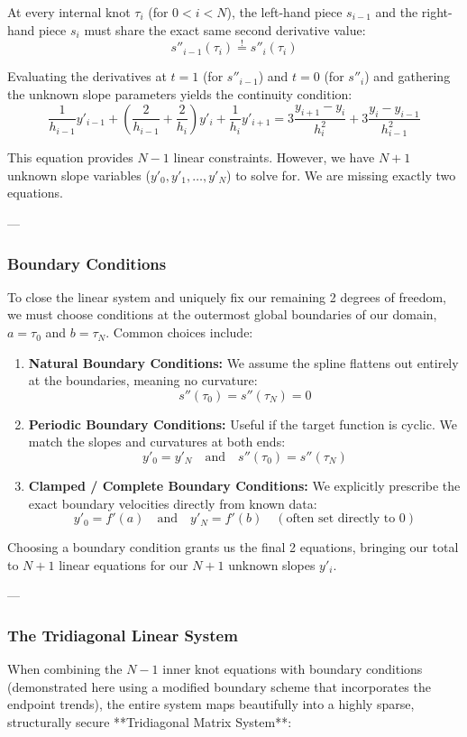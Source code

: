 \documentclass{article}
\begin{document}
At every internal knot $\tau_i$ (for $0 < i < N$), the left-hand piece $s_{i-1}$ and the right-hand piece $s_i$ must share the exact same second derivative value:
\[s''_{i-1}(\tau_i) \overset{!}{=} s''_i(\tau_i)\]

Evaluating the derivatives at $t=1$ (for $s''_{i-1}$) and $t=0$ (for $s''_i$) and gathering the unknown slope parameters yields the continuity condition:
\[\frac{1}{h_{i-1}}y'_{i-1} + \left( \frac{2}{h_{i-1}} + \frac{2}{h_i} \right)y'_i + \frac{1}{h_i}y'_{i+1} = 3\frac{y_{i+1} - y_i}{h_i^2} + 3\frac{y_i - y_{i-1}}{h_{i-1}^2}\]

This equation provides $N - 1$ linear constraints. However, we have $N + 1$ unknown slope variables ($y'_0, y'_1, \dots, y'_N$) to solve for. We are missing exactly two equations.

---

\subsubsection{Boundary Conditions}
To close the linear system and uniquely fix our remaining 2 degrees of freedom, we must choose conditions at the outermost global boundaries of our domain, $a = \tau_0$ and $b = \tau_N$. Common choices include:

\begin{enumerate}
    \item \textbf{Natural Boundary Conditions:} We assume the spline flattens out entirely at the boundaries, meaning no curvature:
    \[s''(\tau_0) = s''(\tau_N) = 0\]
    \item \textbf{Periodic Boundary Conditions:} Useful if the target function is cyclic. We match the slopes and curvatures at both ends:
    \[y'_0 = y'_N \quad \text{and} \quad s''(\tau_0) = s''(\tau_N)\]
    \item \textbf{Clamped / Complete Boundary Conditions:} We explicitly prescribe the exact boundary velocities directly from known data:
    \[y'_0 = f'(a) \quad \text{and} \quad y'_N = f'(b) \quad (\text{often set directly to } 0)\]
\end{enumerate}

Choosing a boundary condition grants us the final 2 equations, bringing our total to $N+1$ linear equations for our $N+1$ unknown slopes $y'_i$.

---

\subsubsection{The Tridiagonal Linear System}
When combining the $N-1$ inner knot equations with boundary conditions (demonstrated here using a modified boundary scheme that incorporates the endpoint trends), the entire system maps beautifully into a highly sparse, structurally secure **Tridiagonal Matrix System**:
\end{document}
